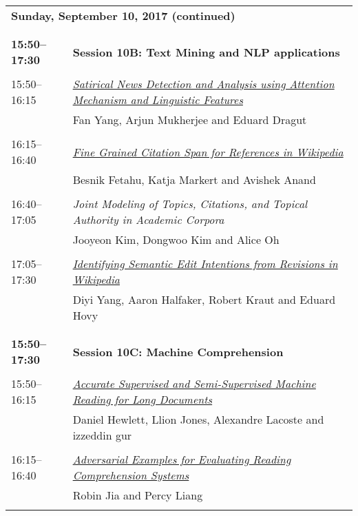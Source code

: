 \newpage
\begin{tabular}{p{20mm}p{128mm}}
\\
\multicolumn{2}{l}{\bf Sunday, September 10, 2017 (continued)} \\\\
\\{\bf 15:50--17:30} & {\bf Session 10B: Text Mining and NLP applications } \\
\\
15:50--16:15 & \hyperlink{page.1968}{\em Satirical News Detection and Analysis using Attention Mechanism and Linguistic Features}\\
         & Fan Yang, Arjun Mukherjee and Eduard Dragut \\
\\

16:15--16:40 & \hyperlink{page.1979}{\em Fine Grained Citation Span for References in Wikipedia}\\
         & Besnik Fetahu, Katja Markert and Avishek Anand \\
\\

16:40--17:05 & {\em Joint Modeling of Topics, Citations, and Topical Authority in Academic Corpora}\\
         & Jooyeon Kim, Dongwoo Kim and Alice Oh \\
\\

17:05--17:30 & \hyperlink{page.1989}{\em Identifying Semantic Edit Intentions from Revisions in Wikipedia}\\
         & Diyi Yang, Aaron Halfaker, Robert Kraut and Eduard Hovy \\
\\

\\{\bf 15:50--17:30} & {\bf Session 10C: Machine Comprehension } \\
\\
15:50--16:15 & \hyperlink{page.2000}{\em Accurate Supervised and Semi-Supervised Machine Reading for Long Documents}\\
         & Daniel Hewlett, Llion Jones, Alexandre Lacoste and izzeddin gur \\
\\

16:15--16:40 & \hyperlink{page.2010}{\em Adversarial Examples for Evaluating Reading Comprehension Systems}\\
         & Robin Jia and Percy Liang \\
\\


\end{tabular}
